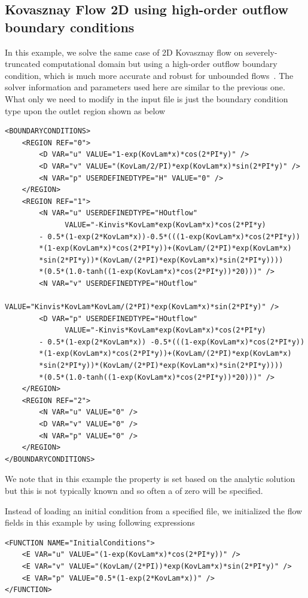 \subsection{Kovasznay Flow 2D using high-order outflow boundary conditions}
\label{s:incns:kovasznay2D_HOBC}
In this example, we solve the same case of 2D Kovasznay flow on
severely-truncated computational domain but using a high-order outflow
boundary condition, which is much more accurate and robust for
unbounded flows~\cite{DoKa14}. The solver information and parameters
used here are similar to the previous one. What only we need to modify
in the input file is just the boundary condition type upon the outlet
region shown as below
\begin{lstlisting}[style=XMLStyle]
<BOUNDARYCONDITIONS>
    <REGION REF="0">
        <D VAR="u" VALUE="1-exp(KovLam*x)*cos(2*PI*y)" />
        <D VAR="v" VALUE="(KovLam/2/PI)*exp(KovLam*x)*sin(2*PI*y)" />
        <N VAR="p" USERDEFINEDTYPE="H" VALUE="0" />
    </REGION>
    <REGION REF="1">
        <N VAR="u" USERDEFINEDTYPE="HOutflow" 
              VALUE="-Kinvis*KovLam*exp(KovLam*x)*cos(2*PI*y) 
		- 0.5*(1-exp(2*KovLam*x))-0.5*(((1-exp(KovLam*x)*cos(2*PI*y))
		*(1-exp(KovLam*x)*cos(2*PI*y))+(KovLam/(2*PI)*exp(KovLam*x)
		*sin(2*PI*y))*(KovLam/(2*PI)*exp(KovLam*x)*sin(2*PI*y))))
		*(0.5*(1.0-tanh((1-exp(KovLam*x)*cos(2*PI*y))*20)))" />
        <N VAR="v" USERDEFINEDTYPE="HOutflow" 
              VALUE="Kinvis*KovLam*KovLam/(2*PI)*exp(KovLam*x)*sin(2*PI*y)" />
        <D VAR="p" USERDEFINEDTYPE="HOutflow" 
              VALUE="-Kinvis*KovLam*exp(KovLam*x)*cos(2*PI*y)
		- 0.5*(1-exp(2*KovLam*x)) -0.5*(((1-exp(KovLam*x)*cos(2*PI*y))
		*(1-exp(KovLam*x)*cos(2*PI*y))+(KovLam/(2*PI)*exp(KovLam*x)
		*sin(2*PI*y))*(KovLam/(2*PI)*exp(KovLam*x)*sin(2*PI*y))))
		*(0.5*(1.0-tanh((1-exp(KovLam*x)*cos(2*PI*y))*20)))" />
    </REGION>
    <REGION REF="2">
        <N VAR="u" VALUE="0" />
        <D VAR="v" VALUE="0" />
        <N VAR="p" VALUE="0" />
    </REGION>
</BOUNDARYCONDITIONS>
\end{lstlisting} 
We note that in this example the  property is set based on
the analytic solution but this is not typically known and so often a
 of zero will be specified.

Instead of loading an initial condition from a specified file, we initialized the flow fields in this example by using following expressions
\begin{lstlisting}[style=XMLStyle]
<FUNCTION NAME="InitialConditions">
    <E VAR="u" VALUE="(1-exp(KovLam*x)*cos(2*PI*y))" />
    <E VAR="v" VALUE="(KovLam/(2*PI))*exp(KovLam*x)*sin(2*PI*y)" />
    <E VAR="p" VALUE="0.5*(1-exp(2*KovLam*x))" />
</FUNCTION>
\end{lstlisting}
